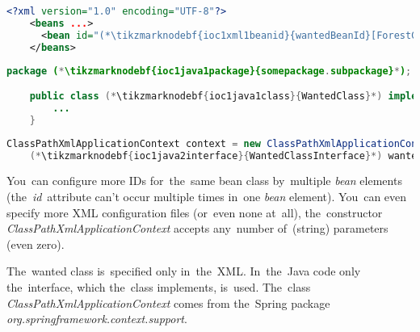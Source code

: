 \begin{lstlisting}[language=XML, title={Configuration XML}]
    <?xml version="1.0" encoding="UTF-8"?>
    <beans ...>
      <bean id="(*\tikzmarknodebf{ioc1xml1beanid}{wantedBeanId}[ForestGreen]*)" class="(*\tikzmarknodebf{ioc1xml1package}{somepackage.subpackage}[ForestGreen]*).(*\tikzmarknodebf{ioc1xml1class}{WantedClass}[ForestGreen]*)"/>
    </beans>
\end{lstlisting}
\begin{lstlisting}[language=Java, title={Wanted class}]
    package (*\tikzmarknodebf{ioc1java1package}{somepackage.subpackage}*);

    public class (*\tikzmarknodebf{ioc1java1class}{WantedClass}*) implements (*\tikzmarknodebf{ioc1java1interface}{WantedClassInterface}*) {
        ...
    }
\end{lstlisting}
\begin{lstlisting}[language=Java, title={Usage}]
    ClassPathXmlApplicationContext context = new ClassPathXmlApplicationContext("configurationFile.xml");
    (*\tikzmarknodebf{ioc1java2interface}{WantedClassInterface}*) wantedClassInstance = context.getBean("(*\tikzmarknodebf{ioc1java2beanid}{wantedBeanId}[ForestGreen]*)", (*\tikzmarknodebf{ioc1java2interface2}{WantedClassInterface}*).class);
\end{lstlisting}

\noindent You~can configure more IDs for~the~same bean class by~multiple \textit{bean} elements (the~\textit{id}~attribute can't occur multiple times in~one \textit{bean} element).
You~can even specify more XML configuration files (or~even none at~all), the~constructor \mbox{\textit{ClassPathXmlApplicationContext}} accepts any~number of~(string) parameters (even zero).

The~wanted class is~specified only in~the~XML.
In~the~Java code only the~interface, which the~class implements, is~used.
The~class \textit{ClassPathXmlApplicationContext} comes from the~Spring package \textit{org.springframework.context.support}.

